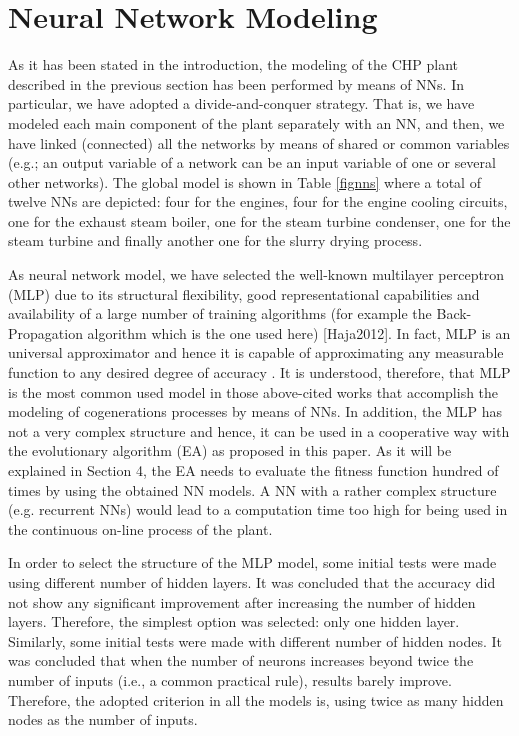 \section{Neural Network Modeling}
\label{NN}

As it has been stated in the introduction, the modeling of the CHP plant described in the previous section has been performed by means of  NNs. In particular, we have adopted a divide-and-conquer strategy. That is, we have modeled each main component of the plant separately with an NN, and then, we have linked (connected) all the networks by means of shared or common variables (e.g.; an output variable of a network can be an input variable of one or several other networks). The global model is shown in Table \ref{fignns} where a total of twelve NNs are depicted: four for the engines, four for the engine cooling  circuits, one for the exhaust steam boiler, one for the steam turbine condenser, one for the steam turbine and finally another one for the slurry drying process. 

As neural network model, we have selected the well-known multilayer perceptron (MLP) due to its structural flexibility, good representational capabilities and availability of a large number of training algorithms (for example the Back-Propagation algorithm which is the one used here) [Haja2012]. In fact, MLP is an universal approximator and hence it is capable of approximating any measurable function to any desired degree of accuracy \cite{Hornik-1989}. It is understood, therefore, that MLP is the most common used model in those above-cited works that accomplish the modeling of cogenerations processes by means of NNs. In addition, the MLP has not a very complex structure and hence, it can be  used in a cooperative way with the evolutionary algorithm (EA) as proposed in this paper. As it will be explained in Section 4, the EA needs to evaluate the fitness function hundred of times by using the obtained NN models. A NN with a rather complex structure (e.g. recurrent NNs) would lead to a computation time too high for being used in the continuous on-line process of the plant.

In order to select the structure of the MLP model, some initial tests were made using different number of hidden layers. It was concluded that the accuracy did not show any significant improvement after increasing the number of hidden layers. Therefore, the simplest option was selected: only one hidden layer. Similarly, some initial tests were made with different number of hidden nodes. It was concluded that when the number of neurons increases beyond twice the number of inputs (i.e., a common practical rule), results barely improve. Therefore, the adopted criterion in all the models is, using twice as many hidden nodes as the number of inputs.

